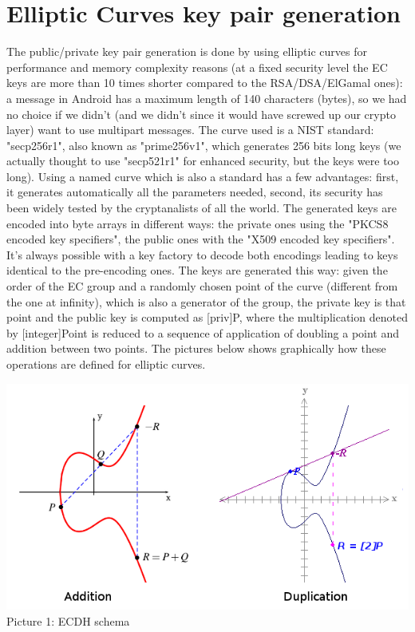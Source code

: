 \section{Elliptic Curves key pair generation}
The public/private key pair generation is done by using elliptic curves for performance and memory complexity reasons (at a fixed security level the EC keys are more than 10 times shorter compared to the RSA/DSA/ElGamal ones): a message in Android has a maximum length of 140 characters (bytes), so we had no choice if we didn't (and we didn't since it would have screwed up our crypto layer) want to use multipart messages. The curve used is a NIST standard: "secp256r1", also known as "prime256v1", which generates 256 bits long keys (we actually thought to use "secp521r1" for enhanced security, but the keys were too long). Using a named curve which is also a standard has a few advantages: first, it generates automatically all the parameters needed, second, its security has been widely tested by the cryptanalists of all the world. The generated keys are encoded into byte arrays in different ways: the private ones using the "PKCS8 encoded key specifiers", the public ones with the "X509 encoded key specifiers". It's always possible with a key factory to decode both encodings leading to keys identical to the pre-encoding ones. The keys are generated this way: given the order of the EC group and a randomly chosen point of the curve (different from the one at infinity), which is also a generator of the group, the private key is that point and the public key is computed as [priv]P, where the multiplication denoted by [integer]Point is reduced to a sequence of application of doubling a point and addition between two points. The pictures below shows graphically how these operations are defined for elliptic curves.\\

\vspace{1cm}
\begin{center}
\includegraphics[scale=0.7]{images/ec}\\

\vspace{1cm}
Picture 1: ECDH schema\\
\end{center}
